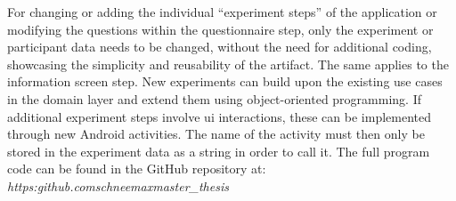 
For changing or adding the individual \enquote{experiment steps} of the application or modifying the questions within the questionnaire step, only the experiment or participant data needs to be changed, without the need for additional coding, showcasing the simplicity and reusability of the artifact. The same applies to the information screen step. New experiments can build upon the existing use cases in the domain layer and extend them using object-oriented programming. If additional experiment steps involve \ac{ui} interactions, these can be implemented through new Android activities. The name of the activity must then only be stored in the experiment data as a string in order to call it. The full program code can be found in the GitHub repository at: \textit{https:\/\/github.com\/schneemax\/master\_thesis}
